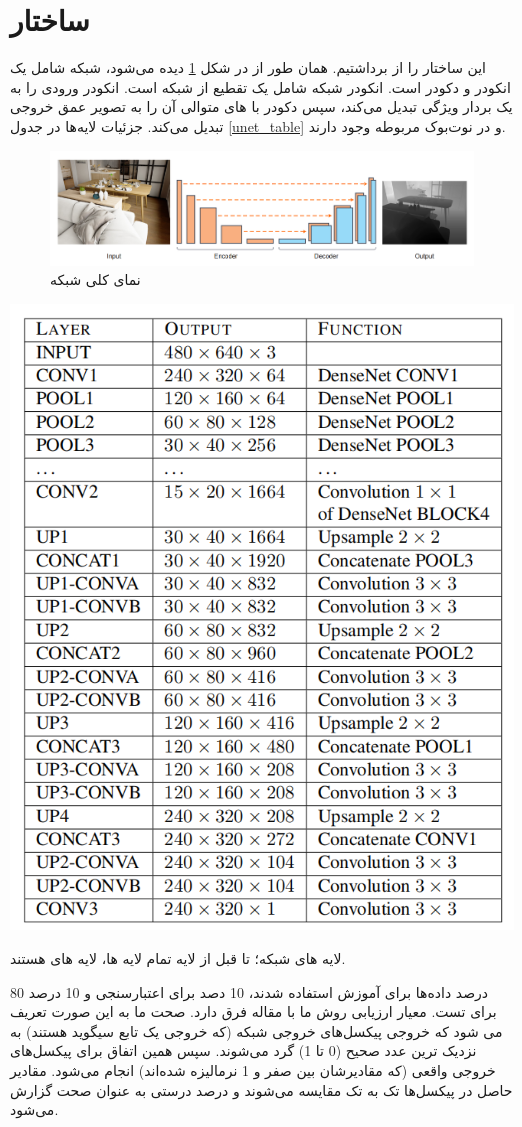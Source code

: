 \documentclass[12pt,a4paper]{report}
\begin{document}
\section{ساختار }
این ساختار را از \cite{alhashim2019high} برداشتیم.
همان طور از در شکل \ref{unet_str} دیده می‌شود، شبکه شامل یک انکودر و دکودر است.
انکودر شبکه شامل یک تقطیع از شبکه  است.
انکودر ورودی را به یک بردار ویژگی تبدیل می‌کند،
سپس دکودر با های متوالی آن را به تصویر
عمق خروجی تبدیل می‌کند. جزئیات لایه‌ها در جدول \ref{unet_table}
و در نوت‌بوک مربوطه وجود دارند.
\begin{figure}
  \centering
  \includegraphics[width=.8\textwidth]{Images//unet1.png}
  \caption{نمای کلی شبکه}\label{unet_str}
\end{figure}
\begin{table}
  \centering
  \includegraphics[width=.5\textwidth]{Images//unet8.png}
  \caption{لایه های شبکه؛ تا قبل از لایه  تمام لایه ها، لایه های  هستند.}\label{unet_table}
\end{table}

80 درصد داده‌ها برای آموزش استفاده شدند،
10 دصد برای اعتبارسنجی و 10 درصد برای تست.
معیار ارزیابی روش ما با مقاله فرق دارد.
صحت ما به این صورت تعریف می شود که خروجی پیکسل‌های خروجی شبکه
(که خروجی یک تابع سیگوید هستند)
به نزدیک ترین عدد صحیح (0 تا 1)
گرد می‌شوند.
سپس همین اتفاق برای پیکسل‌های خروجی واقعی (که مقادیرشان بین صفر و 1 نرمالیزه شده‌اند)
انجام می‌شود.
مقادیر حاصل در پیکسل‌ها تک به تک مقایسه می‌شوند و درصد درستی به عنوان صحت گزارش می‌شود.
\end{document}
